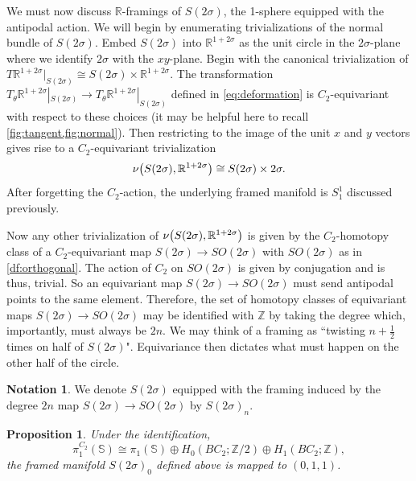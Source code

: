 \documentclass[11pt]{amsart}
\newcommand{\R}{\mathbb R}
\newcommand{\Z}{\mathbb{Z}}
\newcommand{\Sph}{\mathbb{S}}
\theoremstyle{plain}   %
\newtheorem{prop}[thm]{Proposition}
\theoremstyle{definition}
\newtheorem{notn}[thm]{Notation}
\theoremstyle{remark}
\numberwithin{equation}{section}
\let\originalleft\left
\let\originalright\right
\renewcommand{\left}{\mathopen{}\mathclose\bgroup\originalleft}
\renewcommand{\right}{\aftergroup\egroup\originalright}
\begin{document}
We must now discuss $\R$-framings of $S(2\sigma)$, the 1-sphere equipped with the antipodal action. We will begin by enumerating trivializations of the normal bundle of $S(2\sigma)$. Embed $S(2\sigma)$ into $\R^{1+2\sigma}$ as the unit circle in the $2\sigma$-plane where we identify $2\sigma$ with the $xy$-plane. Begin with the canonical trivialization of $T\R^{1+2\sigma}|_{S(2\sigma)}\cong S(2\sigma)\times\R^{1+2\sigma}$. The transformation $T_\theta\R^{1+2\sigma}|_{S(2\sigma)}\to T_\theta\R^{1+2\sigma}|_{S(2\sigma)}$ defined in \cref{eq:deformation} is $C_2$-equivariant with respect to these choices (it may be helpful here to recall \cref{fig:tangent,fig:normal}). Then restricting to the image of the unit $x$ and $y$ vectors gives rise to a $C_2$-equivariant trivialization
\[
\nu\left(S(2\sigma),\R^{1+2\sigma}\right)\cong S(2\sigma)\times 2\sigma.
\]
After forgetting the $C_2$-action, the underlying framed manifold is $S^1_1$ discussed previously. 

Now any other trivialization of $\nu\left(S(2\sigma),\R^{1+2\sigma}\right)$ is given by the $C_2$-homotopy class of a $C_2$-equivariant map $S(2\sigma)\to SO(2\sigma)$ with $SO(2\sigma)$ as in \cref{df:orthogonal}. The action of $C_2$ on $SO(2\sigma)$ is given by conjugation and is thus, trivial. So an equivariant map $S(2\sigma)\to SO(2\sigma)$ must send antipodal points to the same element. Therefore, the set of homotopy classes of equivariant maps $S(2\sigma)\to SO(2\sigma)$ may be identified with $\Z$ by taking the degree which, importantly, must always be $2n$. We may think of a framing as ``twisting $n+\tfrac{1}{2}$ times on half of $S(2\sigma)$". Equivariance then dictates what must happen on the other half of the circle. 

\begin{notn}
We denote $S(2\sigma)$ equipped with the framing induced by the degree $2n$ map $S(2\sigma)\to SO(2\sigma)$ by $S(2\sigma)_n$.
\end{notn}

\begin{prop}\label{prop:antipodal_base}
Under the identification,
\[
\pi_1^{C_2}(\Sph)\cong \pi_1(\Sph)\oplus H_0(BC_2;\Z/2)\oplus H_1(BC_2;\Z),
\]
the framed manifold $S(2\sigma)_0$ defined above is mapped to $(0,1,1)$.
\end{prop}
\end{document}

